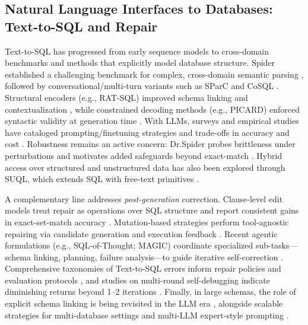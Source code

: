 \documentclass[sigconf,natbib=false]{acmart}
\begin{document}
\subsection{Natural Language Interfaces to Databases: Text-to-SQL and Repair}
Text-to-SQL has progressed from early sequence models \cite{zhong2017seq2sql} to cross-domain benchmarks and methods that explicitly model database structure. Spider established a challenging benchmark for complex, cross-domain semantic parsing \cite{yu2018spider}, followed by conversational/multi-turn variants such as SParC and CoSQL \cite{yu2019sparc,yu2019cosql}. Structural encoders (e.g., RAT-SQL) improved schema linking and contextualization \cite{ratsql2020}, while constrained decoding methods (e.g., PICARD) enforced syntactic validity at generation time \cite{picard2021}. With LLMs, surveys and empirical studies have cataloged prompting/finetuning strategies and trade-offs in accuracy and cost \cite{qin2022survey,gao2024text2sqlsurvey}. Robustness remains an active concern: Dr.Spider probes brittleness under perturbations and motivates added safeguards beyond exact-match \cite{drspider2023}. Hybrid access over structured and unstructured data has also been explored through SUQL, which extends SQL with free-text primitives \cite{suql2024}.

A complementary line addresses \emph{post-generation} correction. Clause-level edit models treat repair as operations over SQL structure and report consistent gains in exact-set-match accuracy \cite{zhang2023text}. Mutation-based strategies perform tool-agnostic repairing via candidate generation and execution feedback \cite{jiang2023repairing}. Recent agentic formulations (e.g., SQL-of-Thought; MAGIC) coordinate specialized sub-tasks—schema linking, planning, failure analysis—to guide iterative self-correction \cite{li2024sql,sun2024magic}. Comprehensive taxonomies of Text-to-SQL errors inform repair policies and evaluation protocols \cite{chen2023comprehensive}, and studies on multi-round self-debugging indicate diminishing returns beyond 1–2 iterations \cite{pourreza2024self}. Finally, in large schemas, the role of explicit schema linking is being revisited in the LLM era \cite{maamari2024death}, alongside scalable strategies for multi-database settings \cite{chen2024linkalign} and multi-LLM expert-style prompting \cite{li2024xsql}.
\end{document}
